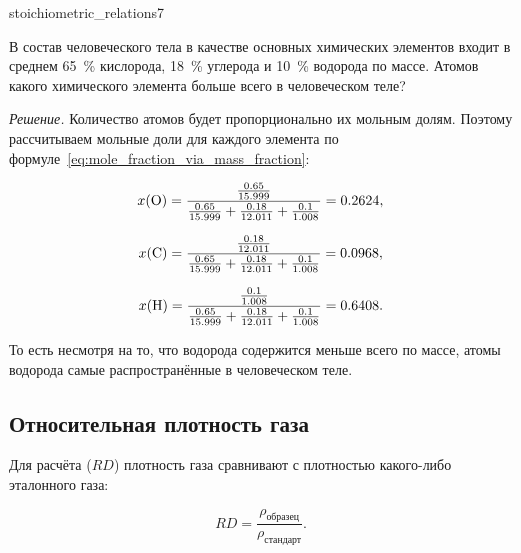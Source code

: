 \begin{example}{}{stoichiometric_relations7}
    \begin{condition}
        В состав человеческого тела в качестве основных химических элементов входит в среднем \qty{65}{\percent} кислорода, \qty{18}{\percent} углерода и \qty{10}{\percent} водорода по массе. Атомов какого химического элемента больше всего в человеческом теле?
    \end{condition}

    \medskip

    \textit{Решение.} Количество атомов будет пропорционально их мольным долям. Поэтому рассчитываем мольные доли для каждого элемента по формуле~\eqref{eq:mole_fraction_via_mass_fraction}:

    \begin{equation*}
        x(\ce{O}) = \frac{\frac{\num{0,65}}{\num{15,999}}}{\frac{\num{0,65}}{\num{15,999}} + \frac{\num{0,18}}{\num{12,011}} + \frac{\num{0,1}}{\num{1,008}}} = \num{0,2624},
    \end{equation*}

    \begin{equation*}
        x(\ce{C}) = \frac{\frac{\num{0,18}}{\num{12,011}}}{\frac{\num{0,65}}{\num{15,999}} + \frac{\num{0,18}}{\num{12,011}} + \frac{\num{0,1}}{\num{1,008}}} = \num{0,0968},
    \end{equation*}

    \begin{equation*}
        x(\ce{H}) = \frac{\frac{\num{0,1}}{\num{1,008}}}{\frac{\num{0,65}}{\num{15,999}} + \frac{\num{0,18}}{\num{12,011}} + \frac{\num{0,1}}{\num{1,008}}} = \num{0,6408}.
    \end{equation*}

    То есть несмотря на то, что водорода содержится меньше всего по массе, атомы водорода самые распространённые в человеческом теле.
\end{example}

\subsection*{Относительная плотность газа}

Для расчёта  ($RD$)  плотность газа сравнивают с плотностью какого-либо эталонного газа:

\begin{equation}
    RD = \frac{{\rho}_{\text{образец}}}{{\rho}_{\text{стандарт}}}.
\end{equation}

